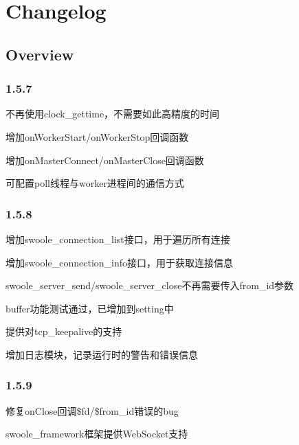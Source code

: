 \part{Changelog}


\chapter{Overview}


\section{1.5.7}


\begin{compactitem}
\item 不再使用clock\_gettime，不需要如此高精度的时间
\item 增加onWorkerStart/onWorkerStop回调函数
\item 增加onMasterConnect/onMasterClose回调函数
\item 可配置poll线程与worker进程间的通信方式
\end{compactitem}


\section{1.5.8}

\begin{compactitem}
\item 增加swoole\_connection\_list接口，用于遍历所有连接
\item 增加swoole\_connection\_info接口，用于获取连接信息
\item swoole\_server\_send/swoole\_server\_close不再需要传入from\_id参数
\item buffer功能测试通过，已增加到setting中
\item 提供对tcp\_keepalive的支持
\item 增加日志模块，记录运行时的警告和错误信息
\end{compactitem}

\section{1.5.9}


\begin{compactitem}
\item 修复onClose回调\$fd/\$from\_id错误的bug
\item swoole\_framework框架提供WebSocket支持
\end{compactitem}

